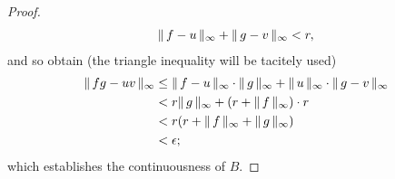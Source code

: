\begin{proof}
\begin{align}
  \norm{\infty}{f-u} + \norm{\infty}{g-v} < r, %
\end{align}
%
and so obtain (the triangle inequality will be tacitely used) %
%
  \begin{align}
    \norm{\infty}{fg - uv} %
      & \leq 
    \norm{\infty}{f-u} \cdot \norm{\infty}{g} + \norm{\infty}{u} \cdot \norm{\infty}{g-v} \\
      & <  r \norm{\infty}{g} + (r + \norm{\infty}{f}) \cdot r \\
      & < r (r + \norm{\infty}{f} + \norm{\infty}{g})  \\
      & < \epsilon; 
  \end{align}
  which establishes the continuousness of $B$. 
  \end{proof}
